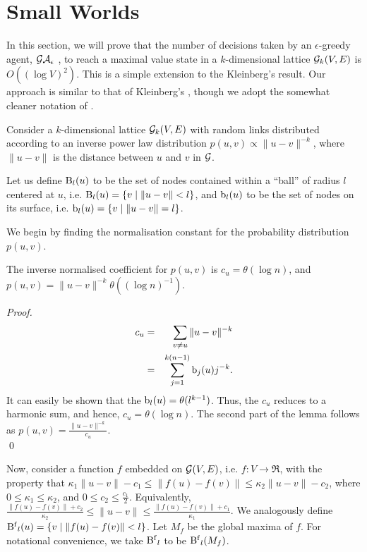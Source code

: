 \section{Small Worlds}
\label{sec:small-worlds}

In this section, we will prove that the number of decisions taken by
an $\epsilon$-greedy agent, $\mathcal{GA}_{\epsilon}~$, to reach a maximal value
state in a $k$-dimensional lattice $\mathcal{G}_k(V,E)$ is $O( (\log
V)^2)$. This is a simple extension to the Kleinberg's result. Our
approach is similar to that of Kleinberg's \cite{Kleinberg2000}, though we
adopt the somewhat cleaner notation of \cite{Martel2004}.

Consider a $k$-dimensional lattice $\mathcal{G}_k(V,E)$ with random links distributed
according to an inverse power law distribution $p(u,v) \propto \|u-v\|^{-k}$,
where $\|u - v\|$ is the distance between $u$ and $v$ in $\mathcal{G}$. 

\begin{definition}
Let us define $\operatorname{B}_l(u)$ to be the set of nodes contained within a
``ball'' of radius $l$ centered at $u$, i.e.  $\operatorname{B}_l(u) = \{ v \mid
\|u - v\| < l \}$, and $\operatorname{b}_l(u)$ to be the set of nodes on its
surface, i.e. $\operatorname{b}_l(u) = \{ v \mid \|u - v\| = l \}$.
\end{definition}

We begin by finding the normalisation constant for the probability
distribution $p(u,v)$.

\begin{lemma}
    The inverse normalised coefficient for $p(u,v)$ is $c_u = \theta(
    \log n )$, and $p(u,v) = \|u - v\|^{-k} \theta( (\log n)^{-1} )$.
\end{lemma}
\begin{proof}
    \begin{eqnarray*}
        c_u &=& \sum_{v \ne u} \|u - v\|^{-k} \\
            &=& \sum_{j=1}^{k(n-1)} \operatorname{b}_j(u) j^{-k}.
    \end{eqnarray*}
    It can easily be shown that the $\operatorname{b}_l(u) = \theta( l^{k-1} )$.
    Thus, the $c_u$ reduces to a harmonic sum, and hence, $c_u =
    \theta( \log n )$.  The second part of the lemma follows as
    $p(u,v) = \frac{ \|u - v\|^{-k} }{c_u}$. 
    \\ \qed
\end{proof}

Now, consider a function $f$ embedded on $\mathcal{G}(V,E)$, i.e. $f : V
\to \Re$, with the property that $\kappa_1 \|u-v\| - c_1 \le \|f(u) -
f(v)\| \le \kappa_2 \|u - v\| - c_2$, where $0 \le \kappa_1 \le
\kappa_2$, and $0 \le c_2 \le \frac{c_1}{2}$. Equivalently,
$\frac{\|f(u)-f(v)\| + c_2}{\kappa_2} \le \|u - v\| \le
\frac{\|f(u)-f(v)\| + c_1}{\kappa_1}$. We analogously define
$\operatorname{B^{f}}_l(u) = \{ v \mid \|f(u) - f(v)\| < l \}$. Let $M_f$ be the
global maxima of $f$. For notational convenience, we take $\operatorname{B^{f}}_l$
to be $\operatorname{B^{f}}_l(M_f)$.

